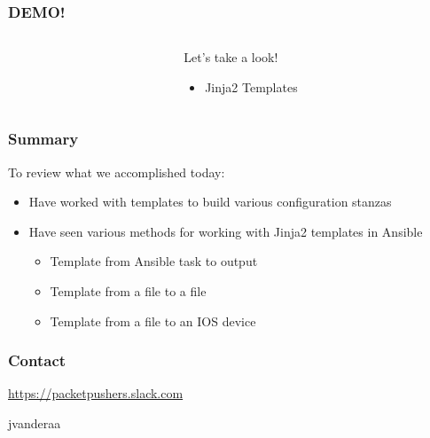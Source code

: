 \documentclass[aspectratio=169]{beamer}
\begin{document}
  \begin{frame}
    \frametitle{DEMO!}
    \begin{columns}
    \begin{column}{0.3\textwidth}
      \Huge
      \begin{center}
        \faDesktop 
        \hspace{.5cm}
        \faRocket     
      \end{center}
    \end{column}
    \begin{column}{0.7\textwidth}
      \huge 
        Let's take a look!
        \begin{itemize}
          \item Jinja2 Templates
        \end{itemize}
    \end{column}
    \end{columns}
  \end{frame}

  \begin{frame}
    \frametitle{Summary}
      To review what we accomplished today:
      \begin{itemize}
        \item <2-> Have worked with templates to build various configuration stanzas
        \item <3-> Have seen various methods for working with Jinja2 templates in Ansible
        \begin{itemize}
            \item <3-> Template from Ansible task to output
            \item <4-> Template from a file to a file
            \item <5-> Template from a file to an IOS device
        \end{itemize}
      \end{itemize}
  \end{frame}

  \begin{frame}
    \frametitle{Contact}
    \huge
    \begin{center}
      \url{https://packetpushers.slack.com}
    \end{center}
    \begin{center}
      \normalsize
      \faSlack \hspace{.1cm}jvanderaa  
    \end{center}
  \end{frame}
\end{document}
